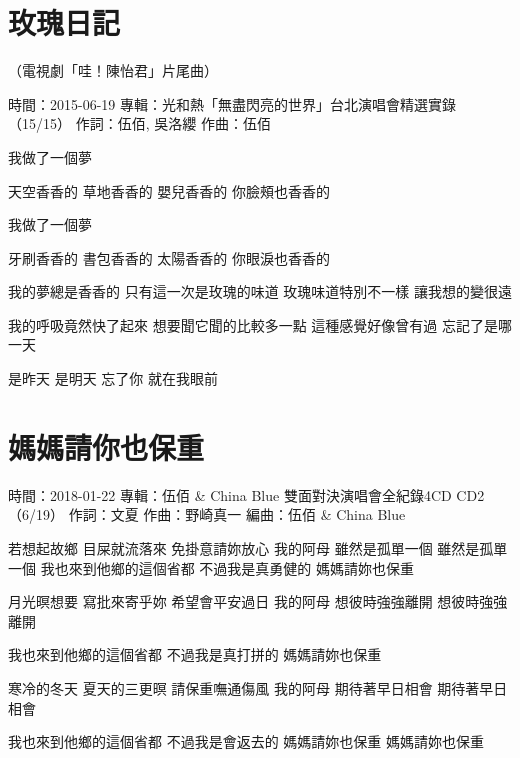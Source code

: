 \documentclass[UTF8,a4paper,oneside,twocolumn,12pt]{ctexbook}
\newcommand{\infopair}[2]{\textbullet #1：#2}
\newcommand{\zc}[1][伍佰]{\infopair{作詞}{#1}}
\newcommand{\zq}[1][伍佰]{\infopair{作曲}{#1}}
\newcommand{\bq}[1][伍佰]{\infopair{編曲}{#1}}
\newcommand{\zj}[1]{\infopair{專輯}{#1}}
\newcommand{\sj}[1]{\infopair{時間}{#1}}
\newenvironment{info}{\begin{flushleft}\kaishu
	}
	{\end{flushleft}\normalsize\yahei\par}
\newenvironment{lyric}{
	}
{}
\begin{document}
\section{玫瑰日記}
\begin{info}
	（電視劇「哇！陳怡君」片尾曲）

	\sj{2015-06-19}
	\zj{光和熱「無盡閃亮的世界」台北演唱會精選實錄（15/15）}
	\zc[伍佰, 吳洛纓]
	\zq
\end{info}
\begin{lyric}
	我做了一個夢

	天空香香的  草地香香的
	嬰兒香香的  你臉頰也香香的

	我做了一個夢

	牙刷香香的  書包香香的
	太陽香香的  你眼淚也香香的

	我的夢總是香香的
	只有這一次是玫瑰的味道
	玫瑰味道特別不一樣
	讓我想的變很遠

	我的呼吸竟然快了起來
	想要聞它聞的比較多一點
	這種感覺好像曾有過
	忘記了是哪一天


	是昨天  是明天
	忘了你  就在我眼前
\end{lyric}

\section{媽媽請你也保重}
\begin{info}
	\sj{2018-01-22}
	\zj{伍佰 \& China Blue 雙面對決演唱會全紀錄4CD CD2（6/19）}
	\zc[文夏]
	\zq[野崎真一]
	\bq[伍佰 \& China Blue]
\end{info}
\begin{lyric}
	若想起故鄉 目屎就流落來
	免掛意請妳放心 我的阿母
	雖然是孤單一個 雖然是孤單一個
	我也來到他鄉的這個省都
	不過我是真勇健的
	媽媽請妳也保重

	月光暝想要 寫批來寄乎妳
	希望會平安過日 我的阿母
	想彼時強強離開 想彼時強強離開

	我也來到他鄉的這個省都
	不過我是真打拼的
	媽媽請妳也保重

	寒冷的冬天 夏天的三更暝
	請保重嘸通傷風 我的阿母
	期待著早日相會 期待著早日相會

	我也來到他鄉的這個省都
	不過我是會返去的
	媽媽請妳也保重
	媽媽請妳也保重
\end{lyric}
\end{document}
